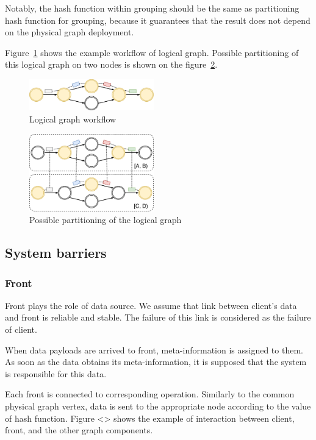 Notably, the hash function within grouping should be the same as partitioning hash function for grouping, because it guarantees that the result does not depend on the physical graph deployment.

Figure~\ref{logical-graph-figure} shows the example workflow of logical graph. Possible partitioning of this logical graph on two nodes is shown on the figure~\ref{physical-graph-figure}.

\begin{figure}[htbp]
  \centering
  \includegraphics[width=0.48\textwidth]{pics/logical-graph}
  \caption{Logical graph workflow}
  \label {logical-graph-figure}
\end{figure}

\begin{figure}[htbp]
  \centering
  \includegraphics[width=0.48\textwidth]{pics/physical-graph}
  \caption{Possible partitioning of the logical graph}
  \label {physical-graph-figure}
\end{figure}

\subsection{System barriers}

\subsubsection{Front}
Front plays the role of data source. We assume that link between client's data and front is reliable and stable. The failure of this link is considered as the failure of client.

When data payloads are arrived to front, meta-information is assigned to them. As soon as the data obtains its meta-information, it is supposed that the system is responsible for this data. 

Each front is connected to corresponding operation. Similarly to the common physical graph vertex, data is sent to the appropriate node according to the value of hash function. Figure <> shows the example of interaction between client, front, and the other graph components.

